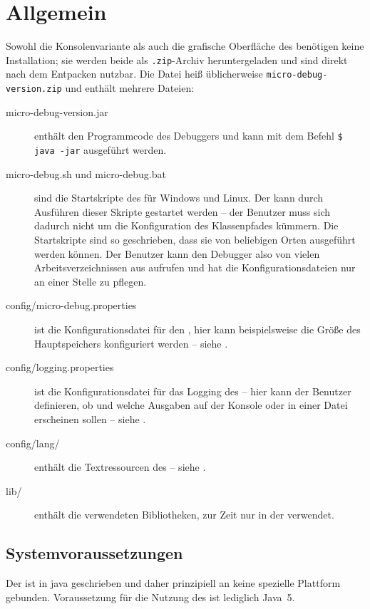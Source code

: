 \chapter{Allgemein}
Sowohl die Konsolenvariante als auch die grafische Oberfläche des \md benötigen keine Installation; sie werden beide als \texttt{.zip}-Archiv heruntergeladen und sind direkt nach dem Entpacken nutzbar. Die Datei heiß üblicherweise \texttt{micro-debug-version.zip} und enthält mehrere Dateien:

\begin{description}
\item[micro-debug-version.jar] enthält den Programmcode des Debuggers und kann mit dem Befehl \texttt{\$ java -jar} ausgeführt werden.
\item[micro-debug.sh und micro-debug.bat] sind die Startskripte des \md für Windows und Linux. Der \md kann durch Ausführen dieser Skripte gestartet werden -- der Benutzer muss sich dadurch nicht um die Konfiguration des Klassenpfades kümmern. Die Startskripte sind so geschrieben, dass sie von beliebigen Orten ausgeführt werden können. Der Benutzer kann den Debugger also von vielen Arbeitsverzeichnissen aus aufrufen und hat die Konfigurationsdateien nur an einer Stelle zu pflegen.
\item[config/micro-debug.properties] ist die Konfigurationsdatei für den \md, hier kann beispielsweise die Größe des Hauptspeichers konfiguriert werden -- siehe .
\item[config/logging.properties] ist die Konfigurationsdatei für das Logging des \md -- hier kann der Benutzer definieren, ob und welche Ausgaben auf der Konsole oder in einer Datei erscheinen sollen -- siehe .
\item[config/lang/] enthält die Textressourcen des \md -- siehe .
\item[lib/] enthält die verwendeten Bibliotheken, zur Zeit nur in der \mdg verwendet.
\end{description}

\section{Systemvoraussetzungen}
Der \md ist in \gls{java} geschrieben und daher prinzipiell an keine spezielle Plattform gebunden. Voraussetzung für die Nutzung des \md ist lediglich Java~5.

